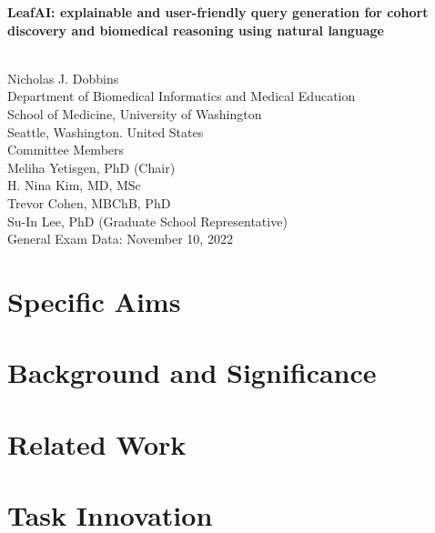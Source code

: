\documentclass[12pt]{article} %
\begin{document}
\begin{titlepage}
    \begin{center}
        \vspace*{1cm}
        \begin{huge}
            \textbf{LeafAI: explainable and user-friendly query generation for cohort discovery and biomedical reasoning using natural language}
        \end{huge} \\
        \vspace{0.7cm}
        Nicholas J. Dobbins \\
        Department of Biomedical Informatics and Medical Education \\
        School of Medicine, University of Washington \\
        Seattle, Washington. United States \\
        \vspace{0.7cm}
        Committee Members \\
        Meliha Yetisgen, PhD (Chair) \\
        H. Nina Kim, MD, MSc \\
        Trevor Cohen, MBChB, PhD \\
        Su-In Lee, PhD (Graduate School Representative) \\
        \vspace{0.7cm}
        General Exam Data: November 10, 2022
    \end{center}
\end{titlepage}

\tableofcontents
\newpage

\section{Specific Aims}
\label{sec:specific_aims}

\newpage

\section{Background and Significance}
\label{sec:background}


\section{Related Work}
\label{sec:related_work}


\section{Task Innovation}
\label{sec:task_innovation}

\end{document}
